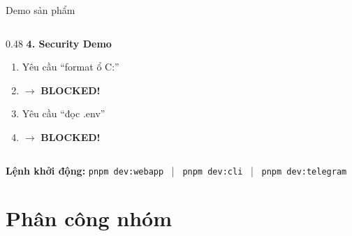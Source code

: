 \documentclass[aspectratio=169,12pt]{beamer}
\begin{document}
\begin{frame}{Demo sản phẩm}
\begin{columns}[T]
\begin{column}{0.48\textwidth}
            \textbf{ 4. Security Demo}
            \begin{enumerate}
                \item Yêu cầu ``format ổ C:''
                \item $\rightarrow$ \textcolor{dangerred}{\textbf{BLOCKED!}}
                \item Yêu cầu ``đọc .env''
                \item $\rightarrow$ \textcolor{dangerred}{\textbf{BLOCKED!}}
            \end{enumerate}
        \end{column}
    \end{columns}

    \vspace{0.5cm}
    \begin{center}
        \colorbox{primaryblue!10}{
            \textbf{Lệnh khởi động:}
            \texttt{pnpm dev:webapp} ~|~
            \texttt{pnpm dev:cli} ~|~
            \texttt{pnpm dev:telegram}
        }
    \end{center}
\end{frame}

\section{Phân công nhóm}
\end{document}
